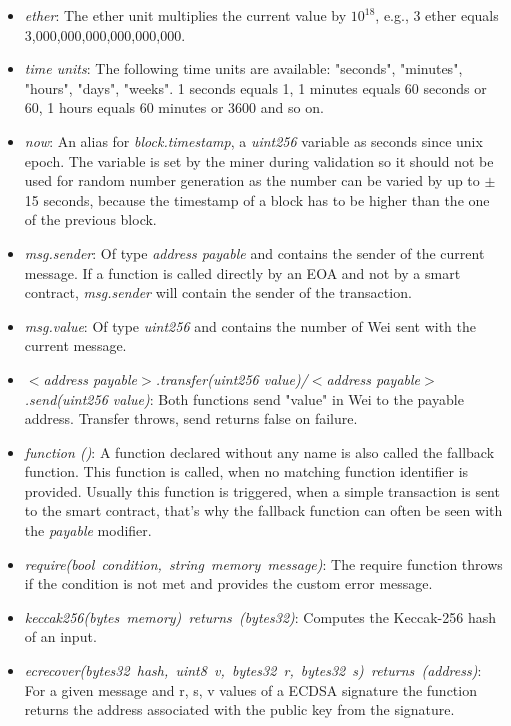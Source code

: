 \begin{itemize}
  \item \textit{ether}: The ether unit multiplies the current value by \(10^{18}\), e.g., 3 ether equals 3,000,000,000,000,000,000.
  \item \textit{time units}: The following time units are available: "seconds", "minutes", "hours", "days", "weeks".
  1 seconds equals 1, 1 minutes equals 60 seconds or 60, 1 hours equals 60 minutes or 3600 and so on.
  \item \textit{now}: An alias for \textit{block.timestamp}, a \textit{uint256} variable as seconds since unix epoch.
  The variable is set by the miner during validation so it should not be used for random number generation as the number can be varied by up to $\pm$ 15 seconds, because the timestamp of a block has to be higher than the one of the previous block.
  \item \textit{msg.sender}: Of type \textit{address payable} and contains the sender of the current message.
  If a function is called directly by an EOA and not by a smart contract, \textit{msg.sender} will contain the sender of the transaction.
  \item \textit{msg.value}: Of type \textit{uint256} and contains the number of Wei sent with the current message.
  \item \textit{$<$address payable$>$.transfer(uint256 value)/$<$address payable$>$.send(uint256 value)}: Both functions send "value" in Wei to the payable address.
  Transfer throws, send returns false on failure.
  \item \textit{function ()}: A function declared without any name is also called the fallback function.
  This function is called, when no matching function identifier is provided.
  Usually this function is triggered, when a simple transaction is sent to the smart contract, that's why the fallback function can often be seen with the \textit{payable} modifier.
  \item \textit{require(bool condition, string memory message)}: The require function throws if the condition is not met and provides the custom error message.
  \item \textit{keccak256(bytes memory) returns (bytes32)}: Computes the Keccak-256 hash of an input.
  \item \textit{ecrecover(bytes32 hash, uint8 v, bytes32 r, bytes32 s) returns (address)}: For a given message and r, s, v values of a ECDSA signature the function returns the address associated with the public key from the signature.
\end{itemize}
